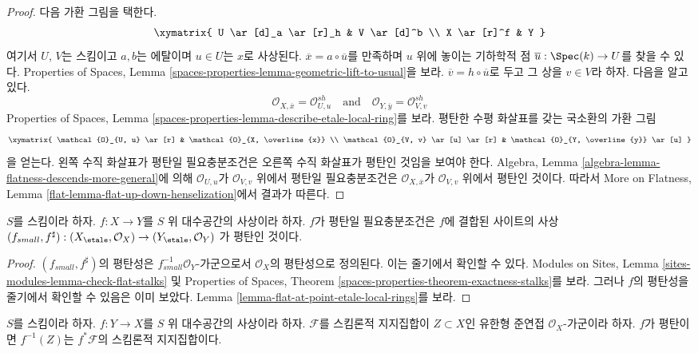 \begin{proof}
다음 가환 그림을 택한다.
$$
\xymatrix{
U \ar[d]_a \ar[r]_h & V \ar[d]^b \\
X \ar[r]^f & Y
}
$$
여기서 $U$, $V$는 스킴이고 $a, b$는 에탈이며 $u \in U$는
$x$로 사상된다. $\overline{x} = a \circ \overline{u}$를 만족하며
$u$ 위에 놓이는 기하학적 점
$\overline{u} : \Spec(k) \to U$를 찾을 수 있다.
Properties of Spaces, Lemma
\ref{spaces-properties-lemma-geometric-lift-to-usual}을 보라.
$\overline{v} = h \circ \overline{u}$로 두고 그 상을 $v \in V$라 하자.
다음을 알고 있다.
$$
\mathcal{O}_{X, \overline{x}} = \mathcal{O}_{U, u}^{sh}
\quad\text{and}\quad
\mathcal{O}_{Y, \overline{y}} = \mathcal{O}_{V, v}^{sh}
$$
Properties of Spaces, Lemma
\ref{spaces-properties-lemma-describe-etale-local-ring}를 보라.
평탄한 수평 화살표를 갖는 국소환의 가환 그림
$$
\xymatrix{
\mathcal{O}_{U, u} \ar[r] &
\mathcal{O}_{X, \overline{x}} \\
\mathcal{O}_{V, v} \ar[u] \ar[r] &
\mathcal{O}_{Y, \overline{y}} \ar[u]
}
$$
을 얻는다. 왼쪽 수직 화살표가 평탄일 필요충분조건은 오른쪽 수직
화살표가 평탄인 것임을 보여야 한다. Algebra, Lemma
\ref{algebra-lemma-flatness-descends-more-general}에 의해
$\mathcal{O}_{U, u}$가 $\mathcal{O}_{V, v}$ 위에서 평탄일 필요충분조건은
$\mathcal{O}_{X, \overline{x}}$가 $\mathcal{O}_{V, v}$ 위에서
평탄인 것이다. 따라서 More on Flatness, Lemma
\ref{flat-lemma-flat-up-down-henselization}에서 결과가 따른다.
\end{proof}

\begin{lemma}
\label{lemma-flat-morphism-sites}
$S$를 스킴이라 하자.
$f : X \to Y$를 $S$ 위 대수공간의 사상이라 하자.
$f$가 평탄일 필요충분조건은 $f$에 결합된 사이트의 사상
$
(f_{small}, f^\sharp) :
(X_\etale, \mathcal{O}_X)
\to
(Y_\etale, \mathcal{O}_Y)
$
가 평탄인 것이다.
\end{lemma}

\begin{proof}
$(f_{small}, f^\sharp)$의 평탄성은
$f_{small}^{-1}\mathcal{O}_Y$-가군으로서 $\mathcal{O}_X$의
평탄성으로 정의된다. 이는 줄기에서 확인할 수 있다.
Modules on Sites, Lemma \ref{sites-modules-lemma-check-flat-stalks} 및
Properties of Spaces, Theorem
\ref{spaces-properties-theorem-exactness-stalks}를 보라.
그러나 $f$의 평탄성을 줄기에서 확인할 수 있음은 이미 보았다.
Lemma \ref{lemma-flat-at-point-etale-local-rings}를 보라.
\end{proof}

\begin{lemma}
\label{lemma-flat-pullback-support}
$S$를 스킴이라 하자. $f : Y \to X$를 $S$ 위 대수공간의 사상이라 하자.
$\mathcal{F}$를 스킴론적 지지집합이 $Z \subset X$인 유한형 준연접
$\mathcal{O}_X$-가군이라 하자.
$f$가 평탄이면 $f^{-1}(Z)$는 $f^*\mathcal{F}$의 스킴론적 지지집합이다.
\end{lemma}

